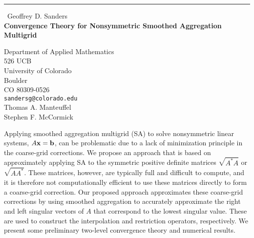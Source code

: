 \documentclass{report}
\begin{document}
\begin{center}
\rule{6in}{1pt} \
{\large Geoffrey D. Sanders \\
{\bf Convergence Theory for Nonsymmetric Smoothed Aggregation Multigrid}}

Department of Applied Mathematics \\ 526 UCB \\ University of Colorado \\ Boulder \\ CO 80309-0526
\\
{\tt sandersg@colorado.edu}\\
Thomas A. Manteuffel\\
Stephen F. McCormick\end{center}

Applying smoothed aggregation multigrid (SA) to solve nonsymmetric
linear systems, $A {\bf x} = {\bf b}$, can be problematic due to a
lack of minimization principle in the coarse-grid corrections.   We
propose an approach that is based on approximately applying SA
to the symmetric
positive definite matrices $\sqrt{A^* A}$ or $\sqrt{A A^*}$.   These
matrices, however, are typically full and difficult to compute, and it
is therefore not computationally efficient to use these matrices
directly to form a coarse-grid correction. Our proposed approach
approximates these coarse-grid corrections by using smoothed
aggregation to accurately approximate
the right and left singular vectors of $A$ that
correspond to the lowest singular value.  These are used
to construct
the interpolation and restriction operators, respectively.
We present some preliminary two-level convergence theory
and numerical results.
\end{document}
